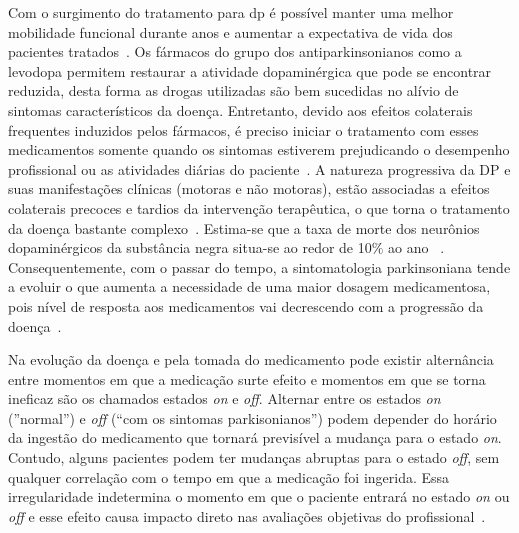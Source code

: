 Com o surgimento do tratamento para \ac{dp} é possível manter uma melhor mobilidade funcional durante anos e aumentar a expectativa de vida dos pacientes tratados~\cite{rodrigues2006}. Os fármacos do grupo dos antiparkinsonianos como a levodopa permitem restaurar a atividade dopaminérgica que pode se encontrar reduzida, desta forma as drogas utilizadas são bem sucedidas no alívio de sintomas característicos da doença. Entretanto, devido aos efeitos colaterais frequentes induzidos pelos fármacos, é preciso iniciar o tratamento com esses medicamentos somente quando os sintomas estiverem prejudicando o desempenho profissional ou as atividades diárias do paciente~\cite{rodrigues2006}. A natureza progressiva da DP e suas manifestações clínicas (motoras e não motoras), estão associadas a efeitos colaterais precoces e tardios da intervenção terapêutica, o que torna o tratamento da doença bastante complexo~\cite{protpar010}. Estima-se que a taxa de morte dos neurônios dopaminérgicos da substância negra situa-se ao redor de 10$\%$ ao ano ~\cite{moris98}. Consequentemente, com o passar do tempo, a sintomatologia parkinsoniana tende a evoluir o que aumenta a necessidade de uma maior dosagem medicamentosa, pois nível de resposta aos medicamentos vai decrescendo com a progressão da doença~\cite{protpar010}.

Na evolução da doença e pela tomada do medicamento pode existir alternância entre momentos em que a medicação surte efeito e momentos em que se torna ineficaz são os chamados estados \textit{on} e \textit{off}. Alternar entre os estados \textit{on} (''normal'') e \textit{off} (``com os sintomas parkisonianos'') podem depender do horário da ingestão do medicamento que tornará previsível a mudança para o estado \textit{on}. Contudo, alguns pacientes podem ter mudanças abruptas para o estado \textit{off}, sem qualquer correlação com o tempo em que a medicação foi ingerida. Essa irregularidade indetermina o momento em que o paciente entrará no estado \textit{on} ou \textit{off} e esse efeito causa impacto direto nas avaliações objetivas do profissional~\cite{kostek12,patel_monitoring_2009}. 

